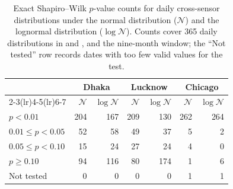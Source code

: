 \begin{table}[ht]
\centering
\small
\begin{tabular}{lrrrrrr}
\toprule
 & \multicolumn{2}{c}{Dhaka} & \multicolumn{2}{c}{Lucknow} & \multicolumn{2}{c}{Chicago} \\
\cmidrule(lr){2-3}\cmidrule(lr){4-5}\cmidrule(lr){6-7}
 & $\mathcal{N}$ & $\log \mathcal{N}$ & $\mathcal{N}$ & $\log \mathcal{N}$ & $\mathcal{N}$ & $\log \mathcal{N}$ \\
\midrule
$p <0.01$ & 204 & 167 & 209 & 130 & 262 & 264 \\
$0.01 \leq p < 0.05$ & 52 & 58 & 49 & 37 & 5 & 2 \\
$0.05 \leq p < 0.10$ & 15 & 24 & 27 & 24 & 4 & 0 \\
$p \geq 0.10$ & 94 & 116 & 80 & 174 & 1 & 6 \\
Not tested & 0 & 0 & 0 & 0 & 1 & 1 \\
\bottomrule
\end{tabular}
\caption{Exact Shapiro--Wilk $p$-value counts for daily cross-sensor distributions under the normal distribution ($\mathcal{N}$) and the lognormal distribution ($\log \mathcal{N}$). Counts cover 365 daily distributions in  and , and the nine-month  window; the ``Not tested'' row records dates with too few valid values for the test.}
\label{tab:shapiro}
\end{table}
